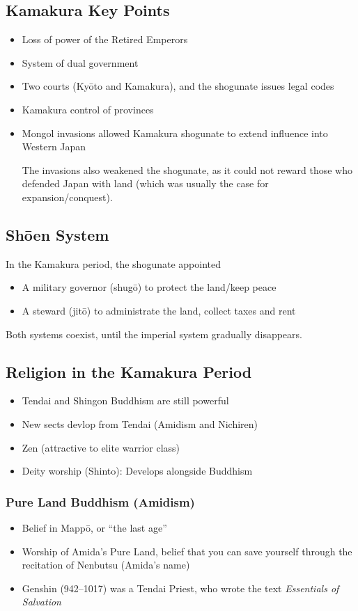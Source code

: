\documentclass[class=article, crop=false]{standalone}
\begin{document}
  \subsection{Kamakura Key Points}
  \begin{itemize}
    \item Loss of power of the Retired Emperors
    \item System of dual government
    \item Two courts (Ky\=oto and Kamakura), and the shogunate issues legal codes
    \item Kamakura control of provinces
    \item Mongol invasions allowed Kamakura shogunate to extend influence into Western Japan
    \begin{note}{}
      The invasions also weakened the shogunate, as it could not reward those who defended Japan with land (which was usually the case for expansion/conquest).
    \end{note}
  \end{itemize}
  \subsection{Sh\=oen System}
  In the Kamakura period, the shogunate appointed
  \begin{itemize}
    \item A military governor (shug\=o) to protect the land/keep peace
    \item A steward (jit\=o) to administrate the land, collect taxes and rent
  \end{itemize}
  Both systems coexist, until the imperial system gradually disappears.
  \subsection{Religion in the Kamakura Period}
  \begin{itemize}
    \item Tendai and Shingon Buddhism are still powerful
    \item New sects devlop from Tendai (Amidism and Nichiren)
    \item Zen (attractive to elite warrior class)
    \item Deity worship (Shinto): Develops alongside Buddhism
  \end{itemize}
  \subsubsection{Pure Land Buddhism (Amidism)}
  \begin{itemize}
    \item Belief in Mapp\=o, or ``the last age''
    \item Worship of Amida's Pure Land, belief that you can save yourself through the recitation of Nenbutsu (Amida's name)
    \item Genshin (942--1017) was a Tendai Priest, who wrote the text \emph{Essentials of Salvation}
  \end{itemize}
\end{document}
